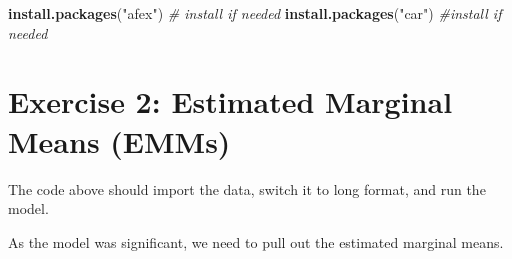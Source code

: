\documentclass[
]{book}
\newenvironment{Shaded}{\begin{snugshade}}{\end{snugshade}}
\newcommand{\AttributeTok}[1]{\textcolor[rgb]{0.13,0.29,0.53}{#1}}
\newcommand{\CommentTok}[1]{\textcolor[rgb]{0.56,0.35,0.01}{\textit{#1}}}
\newcommand{\ConstantTok}[1]{\textcolor[rgb]{0.56,0.35,0.01}{#1}}
\newcommand{\DecValTok}[1]{\textcolor[rgb]{0.00,0.00,0.81}{#1}}
\newcommand{\FunctionTok}[1]{\textcolor[rgb]{0.13,0.29,0.53}{\textbf{#1}}}
\newcommand{\NormalTok}[1]{#1}
\newcommand{\OtherTok}[1]{\textcolor[rgb]{0.56,0.35,0.01}{#1}}
\newcommand{\SpecialCharTok}[1]{\textcolor[rgb]{0.81,0.36,0.00}{\textbf{#1}}}
\newcommand{\StringTok}[1]{\textcolor[rgb]{0.31,0.60,0.02}{#1}}
\let\oldsection\section
\renewcommand{\section}{\needspace{5\baselineskip}\oldsection}
\begin{document}
\begin{Shaded}
\begin{Highlighting}[]
\FunctionTok{install.packages}\NormalTok{(}\StringTok{"afex"}\NormalTok{) }\CommentTok{\# install if needed}
\FunctionTok{install.packages}\NormalTok{(}\StringTok{"car"}\NormalTok{) }\CommentTok{\#install if needed}
\end{Highlighting}
\end{Shaded}

\begin{Shaded}
\end{Shaded}

\section{Exercise 2: Estimated Marginal Means (EMMs)}\label{exercise-2-estimated-marginal-means-emms}

The code above should import the data, switch it to long format, and run the model.

As the model was significant, we need to pull out the estimated marginal means.
\end{document}
